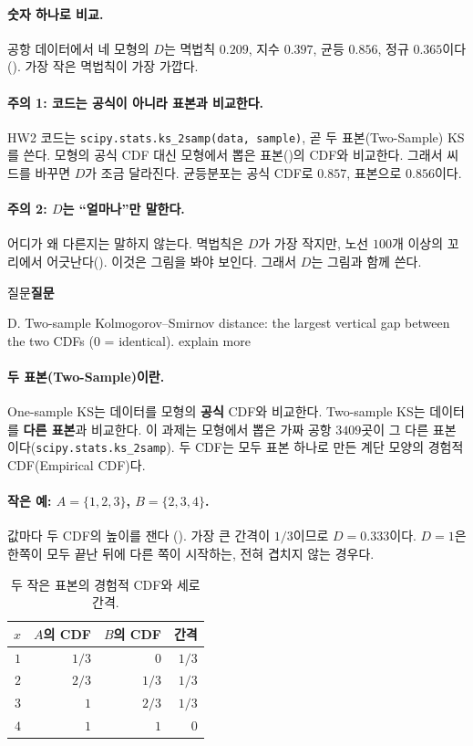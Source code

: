 \documentclass[11pt]{article}
\newenvironment{callout}[1][]
  {\par\medskip\noindent
   \begin{lrbox}{\calloutbox}\begin{minipage}{0.92\linewidth}
   \def\calloutttl{#1}\ifx\calloutttl\empty\else\textbf{#1}\par\smallskip\fi}
  {\end{minipage}\end{lrbox}%
   \fcolorbox{black!30}{black!3}{\usebox{\calloutbox}}\par\medskip}
\newcommand{\term}[1]{\textbf{#1}}
\begin{document}
\paragraph{숫자 하나로 비교.} 공항 데이터에서 네 모형의 $D$는 멱법칙 $0.209$, 지수
$0.397$, 균등 $0.856$, 정규 $0.365$이다(). 가장 작은 멱법칙이 가장
가깝다.

\paragraph{주의 1: 코드는 공식이 아니라 표본과 비교한다.} HW2 코드는
\texttt{scipy.stats.ks\_2samp(data, sample)}, 곧 두 표본(Two-Sample) KS를 쓴다. 모형의
공식 CDF 대신 모형에서 뽑은 표본()의 CDF와 비교한다. 그래서 씨드를
바꾸면 $D$가 조금 달라진다. 균등분포는 공식 CDF로 $0.857$, 표본으로 $0.856$이다.

\paragraph{주의 2: $D$는 ``얼마나''만 말한다.} 어디가 왜 다른지는 말하지 않는다.
멱법칙은 $D$가 가장 작지만, 노선 $100$개 이상의 꼬리에서 어긋난다().
이것은 그림을 봐야 보인다. 그래서 $D$는 그림과 함께 쓴다.

\begin{callout}[질문]
D. Two-sample Kolmogorov--Smirnov distance: the largest vertical gap between the two CDFs
(0 = identical). explain more
\end{callout}

\paragraph{두 표본(Two-Sample)이란.} One-sample KS는 데이터를 모형의 \term{공식} CDF와
비교한다. Two-sample KS는 데이터를 \term{다른 표본}과 비교한다. 이 과제는 모형에서 뽑은
가짜 공항 $3409$곳이 그 다른 표본이다(\texttt{scipy.stats.ks\_2samp}). 두 CDF는 모두 표본
하나로 만든 계단 모양의 경험적 CDF(Empirical CDF)다.

\paragraph{작은 예: $A = \{1, 2, 3\}$, $B = \{2, 3, 4\}$.} 값마다 두 CDF의 높이를 잰다
(). 가장 큰 간격이 $1/3$이므로 $D = 0.333$이다. $D = 1$은 한쪽이
모두 끝난 뒤에 다른 쪽이 시작하는, 전혀 겹치지 않는 경우다.
\begin{table}[H]
  \centering
  \caption{두 작은 표본의 경험적 CDF와 세로 간격.}
  \label{tab:ks-small}
  \begin{tabular}{rrrr}
    \toprule
    $x$ & $A$의 CDF & $B$의 CDF & 간격 \\
    \midrule
    $1$ & $1/3$ & $0$ & $1/3$ \\
    \midrule
    $2$ & $2/3$ & $1/3$ & $1/3$ \\
    \midrule
    $3$ & $1$ & $2/3$ & $1/3$ \\
    \midrule
    $4$ & $1$ & $1$ & $0$ \\
    \bottomrule
  \end{tabular}
\end{table}
\end{document}
